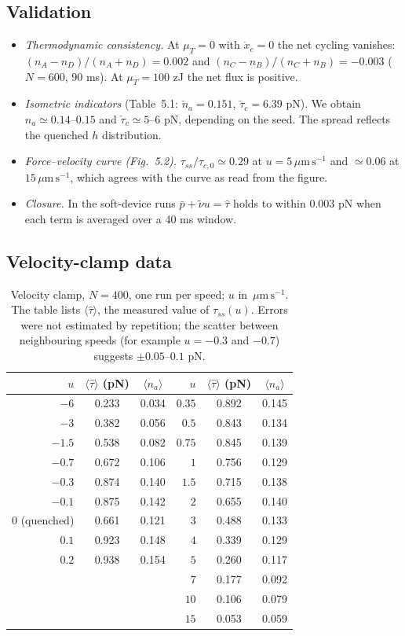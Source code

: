 \documentclass[11pt,a4paper]{article}
\newcommand{\umps}{\,\mu\mathrm{m\,s^{-1}}}
\newcommand{\tauz}{\tau_{c,0}}
\begin{document}
\subsection{Validation}
\begin{itemize}
\item \emph{Thermodynamic consistency.} At $\mu_T=0$ with $\dot x_c=0$ the net cycling vanishes: $(n_A-n_D)/(n_A+n_D)=0.002$ and $(n_C-n_B)/(n_C+n_B)=-0.003$ ($N=600$, 90 ms). At $\mu_T=100$ zJ the net flux is positive.
\item \emph{Isometric indicators} (Table~5.1: $\check n_a=0.151$, $\check\tau_c=6.39$ pN). We obtain $n_a\simeq0.14$--$0.15$ and $\check\tau_c\simeq5$--$6$ pN, depending on the seed. The spread reflects the quenched $h$ distribution.
\item \emph{Force--velocity curve (Fig.~5.2).} $\tau_{ss}/\tauz\simeq0.29$ at $u=5\umps$ and $\simeq0.06$ at $15\umps$, which agrees with the curve as read from the figure.
\item \emph{Closure.} In the soft-device runs $\bar p+\tilde\nu u=\hat\tau$ holds to within 0.003 pN when each term is averaged over a 40 ms window.
\end{itemize}

\subsection{Velocity-clamp data}
\begin{table}[h]
\centering
\begin{tabular}{rcc@{\qquad}rcc}
\toprule
$u$ & $\langle\hat\tau\rangle$ (pN) & $\langle n_a\rangle$ & $u$ & $\langle\hat\tau\rangle$ (pN) & $\langle n_a\rangle$ \\
\midrule
$-6$   & 0.233 & 0.034 & $0.35$ & 0.892 & 0.145 \\
$-3$   & 0.382 & 0.056 & $0.5$  & 0.843 & 0.134 \\
$-1.5$ & 0.538 & 0.082 & $0.75$ & 0.845 & 0.139 \\
$-0.7$ & 0.672 & 0.106 & $1$    & 0.756 & 0.129 \\
$-0.3$ & 0.874 & 0.140 & $1.5$  & 0.715 & 0.138 \\
$-0.1$ & 0.875 & 0.142 & $2$    & 0.655 & 0.140 \\
$0$ (quenched) & 0.661 & 0.121 & $3$ & 0.488 & 0.133 \\
$0.1$  & 0.923 & 0.148 & $4$    & 0.339 & 0.129 \\
$0.2$  & 0.938 & 0.154 & $5$    & 0.260 & 0.117 \\
       &       &       & $7$    & 0.177 & 0.092 \\
       &       &       & $10$   & 0.106 & 0.079 \\
       &       &       & $15$   & 0.053 & 0.059 \\
\bottomrule
\end{tabular}
\caption{Velocity clamp, $N=400$, one run per speed; $u$ in $\umps$. The table lists $\langle\hat\tau\rangle$, the measured value of $\tau_{ss}(u)$. Errors were not estimated by repetition; the scatter between neighbouring speeds (for example $u=-0.3$ and $-0.7$) suggests $\pm0.05$--$0.1$ pN.}
\label{tab:clamp}
\end{table}
\end{document}
